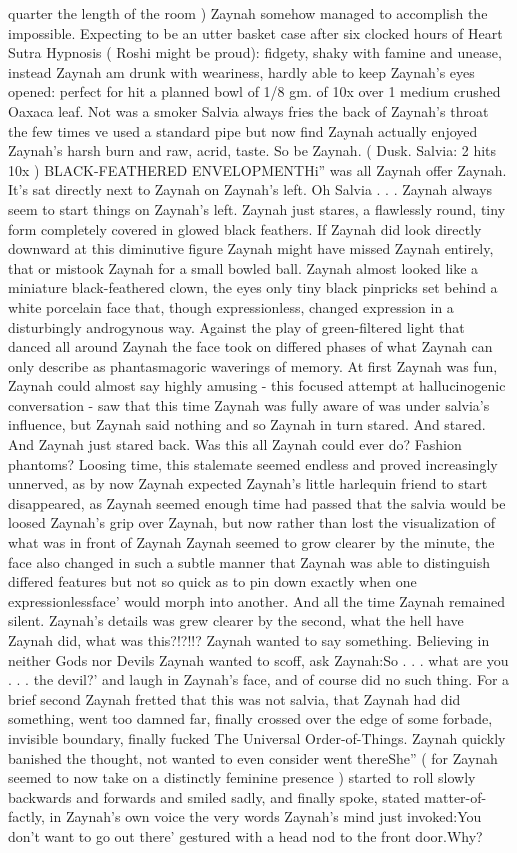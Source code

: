 \documentclass[12pt]{book}
\begin{document}
quarter the length of the room ) Zaynah somehow managed to accomplish the impossible. Expecting to be an utter basket case after six clocked hours of Heart Sutra Hypnosis ( Roshi might be proud): fidgety, shaky with famine and unease, instead Zaynah am drunk with weariness, hardly able to keep Zaynah's eyes opened: perfect for hit a planned bowl of 1/8 gm. of 10x over 1 medium crushed Oaxaca leaf. Not was a smoker Salvia always fries the back of Zaynah's throat the few times ve used a standard pipe but now find Zaynah actually enjoyed Zaynah's harsh burn and raw, acrid, taste. So be Zaynah. ( Dusk. Salvia: 2 hits 10x ) BLACK-FEATHERED ENVELOPMENTHi'' was all Zaynah offer Zaynah. It's sat directly next to Zaynah on Zaynah's left. Oh Salvia . . .  Zaynah always seem to start things on Zaynah's left. Zaynah just stares, a flawlessly round, tiny form completely covered in glowed black feathers. If Zaynah did look directly downward at this diminutive figure Zaynah might have missed Zaynah entirely, that or mistook Zaynah for a small bowled ball. Zaynah almost looked like a miniature black-feathered clown, the eyes only tiny black pinpricks set behind a white porcelain face that, though expressionless, changed expression in a disturbingly androgynous way. Against the play of green-filtered light that danced all around Zaynah the face took on differed phases of what Zaynah can only describe as phantasmagoric waverings of memory. At first Zaynah was fun, Zaynah could almost say highly amusing - this focused attempt at hallucinogenic conversation - saw that this time Zaynah was fully aware of was under salvia's influence, but Zaynah said nothing and so Zaynah in turn stared. And stared. And Zaynah just stared back. Was this all Zaynah could ever do? Fashion phantoms? Loosing time, this stalemate seemed endless and proved increasingly unnerved, as by now Zaynah expected Zaynah's little harlequin friend to start disappeared, as Zaynah seemed enough time had passed that the salvia would be loosed Zaynah's grip over Zaynah, but now rather than lost the visualization of what was in front of Zaynah Zaynah seemed to grow clearer by the minute, the face also changed in such a subtle manner that Zaynah was able to distinguish differed features but not so quick as to pin down exactly when one expressionlessface' would morph into another. And all the time Zaynah remained silent. Zaynah's details was grew clearer by the second, what the hell have Zaynah did, what was this?!?!!? Zaynah wanted to say something. Believing in neither Gods nor Devils Zaynah wanted to scoff, ask Zaynah:So . . .  what are you . . .  the devil?' and laugh in Zaynah's face, and of course did no such thing. For a brief second Zaynah fretted that this was not salvia, that Zaynah had did something, went too damned far, finally crossed over the edge of some forbade, invisible boundary, finally fucked The Universal Order-of-Things. Zaynah quickly banished the thought, not wanted to even consider went thereShe'' ( for Zaynah seemed to now take on a distinctly feminine presence ) started to roll slowly backwards and forwards and smiled sadly, and finally spoke, stated matter-of-factly, in Zaynah's own voice the very words Zaynah's mind just invoked:You don't want to go out there' gestured with a head nod to the front door.Why? 
\end{document}
